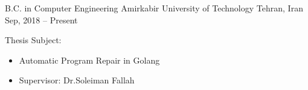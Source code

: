 

\begin{cventries}

  \cventry 
    {B.C. in Computer Engineering} %
    {Amirkabir University of Technology} %
    {Tehran, Iran} %
    {Sep, 2018 – Present} %
    {
        \begin{cvitems}
        \item {Thesis Subject:}
        \begin{itemize}
        \item {Automatic Program Repair in Golang}
        \item {Supervisor: Dr.Soleiman Fallah}
        \end{itemize}
        \end{cvitems}
    }

\end{cventries}

